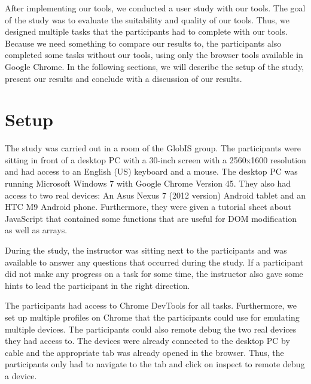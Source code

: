 After implementing our tools, we conducted a user study with our tools. The goal of the study was to evaluate the suitability and quality of our tools. Thus, we designed multiple tasks that the participants had to complete with our tools. Because we need something to compare our results to, the participants also completed some tasks without our tools, using only the browser tools available in Google Chrome. In the following sections, we will describe the setup of the study, present our results and conclude with a discussion of our results.

\section{Setup}

The study was carried out in a room of the GlobIS group. The participants were sitting in front of a desktop PC with a 30-inch screen with a 2560x1600 resolution and had access to an English (US) keyboard and a mouse. The desktop PC was running Microsoft Windows 7 with Google Chrome Version 45. They also had access to two real devices: An Asus Nexus 7 (2012 version) Android tablet and an HTC M9 Android phone. Furthermore, they were given a tutorial sheet about JavaScript that contained some functions that are useful for DOM modification as well as arrays. 

During the study, the instructor was sitting next to the participants and was available to answer any questions that occurred during the study. If a participant did not make any progress on a task for some time, the instructor also gave some hints to lead the participant in the right direction.

The participants had access to Chrome DevTools for all tasks. Furthermore, we set up multiple profiles on Chrome that the participants could use for emulating multiple devices. The participants could also remote debug the two real devices they had access to. The devices were already connected to the desktop PC by cable and the appropriate tab was already opened in the browser. Thus, the participants only had to navigate to the tab and click on inspect to remote debug a device. 

